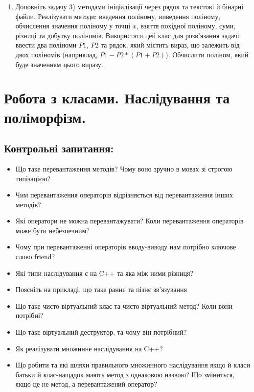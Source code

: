 \documentclass[a5paper,titlepage,openany,twoside,
]
{book_unv}%
\begin{document}
\begin{enumerate}
\begin{enumerate}
\begin{enumerate}
\def\labelenumi{\arabic{enumi})}
\setcounter{enumi}{18}
\item
Доповніть задачу 3) методами ініціалізації через рядок та текстові й бінарні файли.
Реалізувати методи: введення поліному, виведення поліному, обчислення
значення поліному у точці $x$, взяття похідної поліному, суми, різниці та
добутку поліномів. Використати цей клас для розв'язання задачі: ввести два
поліноми $P1$, $P2$ та рядок, який містить вираз, що залежить від двох
поліномів (наприклад, $P1 - P2*(P1 + P2) $). Обчислити поліном, який буде значенням цього виразу.

\end{enumerate}


\chapter{Робота з класами. Наслідування та поліморфізм.}
%

\section{Контрольні запитання:}
\begin{itemize}
\item
    Що таке перевантаження методів? Чому воно зручно в мовах зі строгою
  типізацією?
\item
  Чим перевантаження операторів відрізняється від перевантаження інших
  методів?
\item
  Які оператори не можна перевантажувати? Коли перевантаження операторів
  може бути небезпечним?
\item
  Чому при перевантаженні операторів вводу-виводу нам потрібно ключове
  слово friend?
\item
  Які типи наслідування є на C++ та яка між ними різниця?
\item
  Поясніть на прикладі, що таке раннє та пізнє зв'язування
\item
  Що таке чисто віртуальний клас та чисто віртуальний метод? Коли вони
  потрібні?
\item
  Що таке віртуальний деструктор, та чому він потрібний?
\item
  Як реалізувати множинне наслідування на C++?
\item
  Що робити та які шляхи правильного множинного наслідування якщо й
  класи батьки й клас-нащадок мають метод з однаковою назвою? Що зміниться,
  якщо це не метод, а перевантажений оператор?
\end{itemize}


\end{enumerate}
\end{enumerate}
\end{document}
